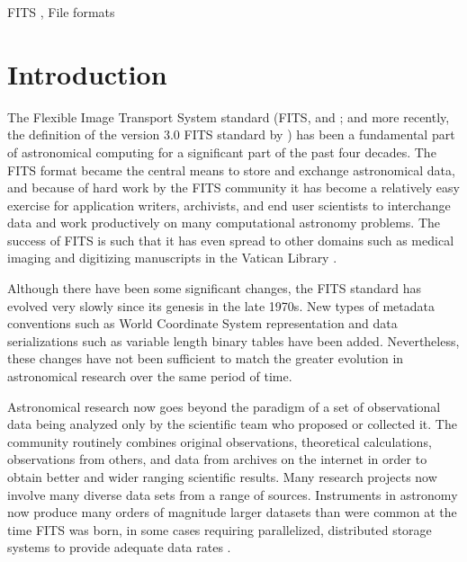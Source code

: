 \documentclass[final,authoryear,5p,times,twocolumn]{elsarticle}
\begin{document}
\begin{frontmatter}
\begin{abstract}
\end{abstract}

\begin{keyword}


FITS \sep
File formats

\end{keyword}

\end{frontmatter}


\newcommand{\aspconf}{ASP Conf.\ Ser}
\newcommand{\aap}{A\&A}
\newcommand{\aaps}{A\&AS}
\newcommand{\jrasc}{JRASC}
\newcommand{\qjras}{QJRAS}

\section{Introduction}


The Flexible Image Transport System standard (FITS,
\citealt{1981A&AS...44..363W} and \citealt{2001A&A...376..359H}; and
more recently, the definition of the version 3.0 FITS standard by
\citealt{2010A&A...524A..42P}) has been a fundamental part of
astronomical computing for a significant part of the past four
decades. The FITS format became the central means to store and
exchange astronomical data, and because of hard work by the FITS
community it has become a relatively easy exercise for application
writers, archivists, and end user scientists to interchange data and
work productively on many computational astronomy problems. The
success of FITS is such that it has even spread to other domains such
as medical imaging and digitizing manuscripts in the Vatican Library
\citep{2006JRASC.100..242W,2012EWASSAlle}.


Although there have been some significant changes, the FITS standard
has evolved very slowly since its genesis in the late 1970s. New types
of metadata conventions such as World Coordinate System
\citep[WCS;][]{2002A&A...395.1061G,2002A&A...395.1077C,2006A&A...446..747G}
representation and data serializations such as variable length binary
tables \citep{1995A&AS..113..159C} have been added. Nevertheless,
these changes have not been sufficient to match the greater evolution
in astronomical research over the same period of time.


Astronomical research now goes beyond the paradigm of a set of
observational data being analyzed only by the scientific team who
proposed or collected it. The community routinely combines original
observations, theoretical calculations, observations from others, and
data from archives on the internet in order to obtain better and wider
ranging scientific results. Many research projects now involve many
diverse data sets from a range of sources. Instruments in astronomy
now produce many orders of magnitude larger datasets than were common
at the time FITS was born, in some cases requiring parallelized,
distributed storage systems to provide adequate data rates
\citep{2012ASPC..461..283A}.
\end{document}
